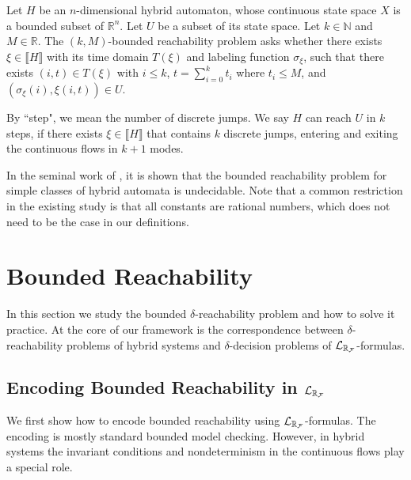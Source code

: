 \documentclass[12pt]{article}
\begin{document}
\begin{definition}
Let $H$ be an $n$-dimensional hybrid automaton, whose continuous state space
$X$ is a bounded subset of $\mathbb{R}^n$. Let $U$ be a subset of its state
space. Let $k\in \mathbb{N}$ and $M \in \mathbb{R}$. The {$(k,M)$-bounded
reachability problem} asks whether there exists
$\xi\in\llbracket H \rrbracket$ with its time domain $T(\xi)$ and labeling function
$\sigma_{\xi}$, such that there exists $(i,t)\in T(\xi)$ with $i\leq k$, $t=
\sum_{i=0}^k t_i$ where $t_i \leq M$, and $(\sigma_{\xi}(i), \xi(i,t))\in U.$
\end{definition}
\begin{remark}
By ``step", we mean the number of discrete jumps. We say $H$ can reach $U$ in $k$ steps, if there exists $\xi\in\llbracket H\rrbracket$ that contains $k$ discrete jumps, entering and exiting the continuous flows in $k+1$ modes.
\end{remark}
In the seminal work of \cite{DBLP:conf/rex/AlurD91,DBLP:conf/hybrid/AlurCHH92},
it is shown that the bounded reachability problem for simple classes of hybrid
automata is undecidable. Note that a common restriction in the existing study is that all constants are rational numbers, which does not need to be the case in our definitions. 
\section{Bounded Reachability}\label{main}

In this section we study the bounded $\delta$-reachability problem and how to solve it practice. At the core of our framework is the correspondence between $\delta$-reachability problems of hybrid systems and $\delta$-decision problems of $\mathcal{L}_{\mathbb{R}_{\mathcal{F}}}$-formulas.
\subsection{Encoding Bounded Reachability in $\mathcal{L}_{\mathbb{R}_{\mathcal{F}}}$}

We first show how to encode bounded reachability using $\mathcal{L}_{\mathbb{R}_{\mathcal{F}}}$-formulas. The encoding is mostly standard bounded model checking. However, in hybrid systems the invariant conditions and nondeterminism in the continuous flows play a special role.
\end{document}
